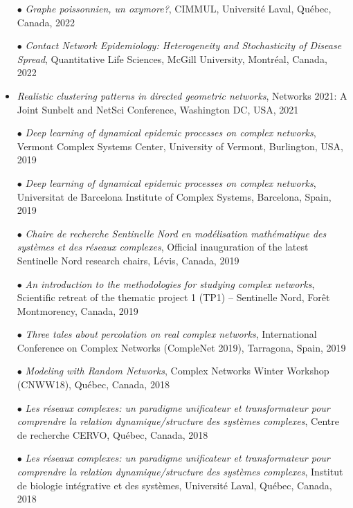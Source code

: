\documentclass[11pt]{article}
\begin{document}
\begin{itemize}[itemsep=0.5em]
%
  \item[$\bullet$] \textit{Graphe poissonnien, un oxymore?}, CIMMUL, Université Laval, Québec, Canada, 2022
%
  \item[$\bullet$] \textit{Contact Network Epidemiology: Heterogeneity and Stochasticity of Disease Spread}, Quantitative Life Sciences, McGill University, Montréal, Canada, 2022
%
  \item \textit{Realistic clustering patterns in directed geometric networks}, Networks 2021: A Joint Sunbelt and NetSci Conference, Washington DC, USA, 2021
%
  \item[$\bullet$] \textit{Deep learning of dynamical epidemic processes on complex networks}, Vermont Complex Systems Center, University of Vermont, Burlington, USA, 2019
%
  \item[$\bullet$] \textit{Deep learning of dynamical epidemic processes on complex networks}, Universitat de Barcelona Institute of Complex Systems, Barcelona, Spain, 2019
%
  \item[$\bullet$] \textit{Chaire de recherche Sentinelle Nord en modélisation mathématique des systèmes et des réseaux complexes}, Official inauguration of the latest Sentinelle Nord research chairs, L\'evis, Canada, 2019
%
  \item[$\bullet$] \textit{An introduction to the methodologies for studying complex networks}, Scientific retreat of the thematic project 1 (TP1) – Sentinelle Nord, For\^et Montmorency, Canada, 2019
%
  \item[$\bullet$] \textit{Three tales about percolation on real complex networks}, International Conference on Complex Networks (CompleNet 2019), Tarragona, Spain, 2019
%
  \item[$\bullet$] \textit{Modeling with Random Networks}, Complex Networks Winter Workshop (CNWW18), Qu\'ebec, Canada, 2018
%
  \item[$\bullet$] \textit{Les réseaux complexes: un paradigme unificateur et transformateur pour comprendre la relation dynamique/structure des systèmes complexes}, Centre de recherche CERVO, Qu\'ebec, Canada, 2018
%
  \item[$\bullet$] \textit{Les réseaux complexes: un paradigme unificateur et transformateur pour comprendre la relation dynamique/structure des systèmes complexes}, Institut de biologie intégrative et des systèmes, Université Laval, Qu\'ebec, Canada, 2018

\end{itemize}
\end{document}
